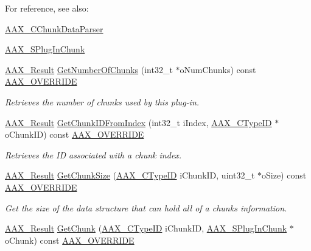 \begin{Indent}
{For reference, see also\+: \begin{DoxyItemize}
\item \mbox{\hyperlink{a01461}{A\+A\+X\+\_\+\+C\+Chunk\+Data\+Parser}} \item \mbox{\hyperlink{a01421}{A\+A\+X\+\_\+\+S\+Plug\+In\+Chunk}} \end{DoxyItemize}
}\begin{DoxyCompactItemize}
\item 
\mbox{\hyperlink{a00392_a4d8f69a697df7f70c3a8e9b8ee130d2f}{A\+A\+X\+\_\+\+Result}} \mbox{\hyperlink{a01481_a1b2e04986362ca076b862ceae18bbab7}{Get\+Number\+Of\+Chunks}} (int32\+\_\+t $\ast$o\+Num\+Chunks) const \mbox{\hyperlink{a00392_ac2f24a5172689ae684344abdcce55463}{A\+A\+X\+\_\+\+O\+V\+E\+R\+R\+I\+DE}}
\begin{DoxyCompactList}\small\item\em Retrieves the number of chunks used by this plug-\/in. \end{DoxyCompactList}\item 
\mbox{\hyperlink{a00392_a4d8f69a697df7f70c3a8e9b8ee130d2f}{A\+A\+X\+\_\+\+Result}} \mbox{\hyperlink{a01481_a493471529cb63af2e6b069f6c6a35d6f}{Get\+Chunk\+I\+D\+From\+Index}} (int32\+\_\+t i\+Index, \mbox{\hyperlink{a00392_ac678f9c1fbcc26315d209f71a147a175}{A\+A\+X\+\_\+\+C\+Type\+ID}} $\ast$o\+Chunk\+ID) const \mbox{\hyperlink{a00392_ac2f24a5172689ae684344abdcce55463}{A\+A\+X\+\_\+\+O\+V\+E\+R\+R\+I\+DE}}
\begin{DoxyCompactList}\small\item\em Retrieves the ID associated with a chunk index. \end{DoxyCompactList}\item 
\mbox{\hyperlink{a00392_a4d8f69a697df7f70c3a8e9b8ee130d2f}{A\+A\+X\+\_\+\+Result}} \mbox{\hyperlink{a01481_aade2d4ba2fcb8c302917caf4bfb0f8cf}{Get\+Chunk\+Size}} (\mbox{\hyperlink{a00392_ac678f9c1fbcc26315d209f71a147a175}{A\+A\+X\+\_\+\+C\+Type\+ID}} i\+Chunk\+ID, uint32\+\_\+t $\ast$o\+Size) const \mbox{\hyperlink{a00392_ac2f24a5172689ae684344abdcce55463}{A\+A\+X\+\_\+\+O\+V\+E\+R\+R\+I\+DE}}
\begin{DoxyCompactList}\small\item\em Get the size of the data structure that can hold all of a chunk\textquotesingle{}s information. \end{DoxyCompactList}\item 
\mbox{\hyperlink{a00392_a4d8f69a697df7f70c3a8e9b8ee130d2f}{A\+A\+X\+\_\+\+Result}} \mbox{\hyperlink{a01481_aeddfa6e0b92f9373836ae41491114c4d}{Get\+Chunk}} (\mbox{\hyperlink{a00392_ac678f9c1fbcc26315d209f71a147a175}{A\+A\+X\+\_\+\+C\+Type\+ID}} i\+Chunk\+ID, \mbox{\hyperlink{a01421}{A\+A\+X\+\_\+\+S\+Plug\+In\+Chunk}} $\ast$o\+Chunk) const \mbox{\hyperlink{a00392_ac2f24a5172689ae684344abdcce55463}{A\+A\+X\+\_\+\+O\+V\+E\+R\+R\+I\+DE}}

\end{DoxyCompactItemize}
\end{Indent}
